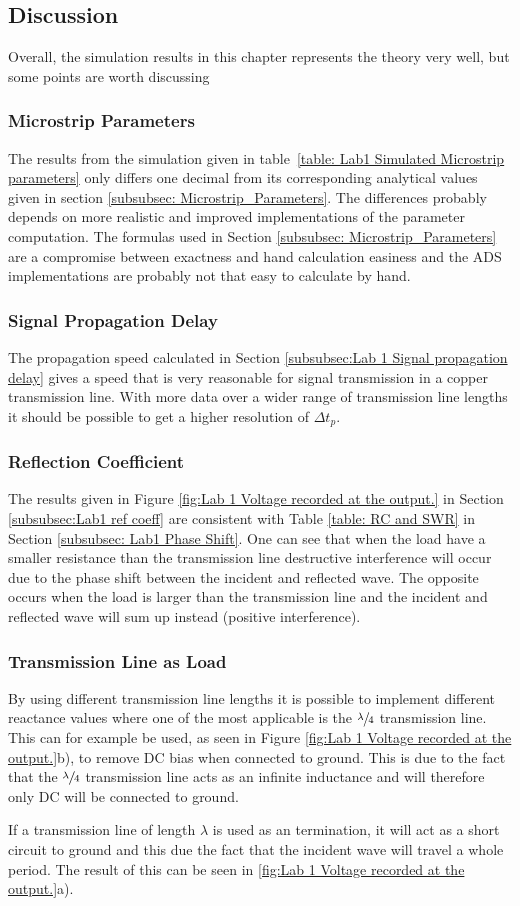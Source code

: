 \documentclass[report.tex]{subfiles}
\begin{document}
\subsection{Discussion}
Overall, the simulation results in this chapter represents the theory very well, but some points are worth discussing
\subsubsection{Microstrip Parameters}
The results from the simulation given in table~\ref{table: Lab1 Simulated Microstrip parameters} only differs one decimal from its corresponding analytical values given in section \ref{subsubsec: Microstrip_Parameters}. The differences probably depends on more realistic and improved implementations of the parameter computation. The formulas used in Section \ref{subsubsec: Microstrip_Parameters} are a compromise between exactness and hand calculation easiness and the ADS implementations are probably not that easy to calculate by hand.
\subsubsection{Signal Propagation Delay}
The propagation speed calculated in Section \ref{subsubsec:Lab 1 Signal propagation delay} gives a speed that is very reasonable for signal transmission in a copper transmission line. With more data over a wider range of transmission line lengths it should be possible to get a higher resolution of $\Delta t_p$.
\subsubsection{Reflection Coefficient}
The results given in Figure \ref{fig:Lab 1 Voltage recorded at the output.} in Section \ref{subsubsec:Lab1 ref coeff} are consistent with Table \ref{table: RC and SWR} in Section \ref{subsubsec: Lab1 Phase Shift}. One can see that when the load have a smaller resistance than the transmission line destructive interference will occur due to the phase shift between the incident and reflected wave. The opposite occurs when the load is larger than the transmission line and the incident and reflected wave will sum up instead (positive interference).
\subsubsection{Transmission Line as Load}
By using different transmission line lengths it is possible to implement different reactance values where one of the most applicable is the $\sfrac{\lambda}{4}$ transmission line. This can for example be used, as seen in Figure \ref{fig:Lab 1 Voltage recorded at the output.}b), to remove DC bias when connected to ground. This is due to the fact that the  $\sfrac{\lambda}{4}$ transmission line acts as an infinite inductance and will therefore only DC will be connected to ground.

If a transmission line of length $\lambda$ is used as an termination, it will act as a short circuit to ground and this due the fact that the incident wave will travel a whole period. The result of this can be seen in \ref{fig:Lab 1 Voltage recorded at the output.}a).
\end{document}
